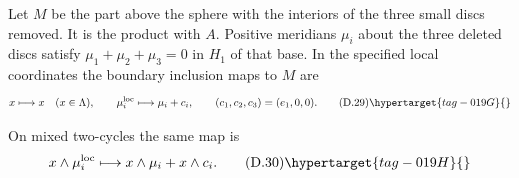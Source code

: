 Let $M$ be the part above the sphere with the
interiors of the three small discs removed. It is the
product with $A$. Positive meridians $\mu_i$ about the
three deleted discs satisfy
$\mu_1+\mu_2+\mu_3=0$ in $H_1$ of that base. In the
specified local coordinates the boundary inclusion maps
to $M$ are
\[
 x\longmapsto x\quad(x\in\Lambda),\qquad
 \mu_i^{\rm loc}\longmapsto\mu_i+c_i,
 \qquad(c_1,c_2,c_3)=(e_1,0,0).
\tag{D.29}\hypertarget{tag-019G}{}\label{cdp:eq:D.29}
\]


On mixed
two-cycles the same map is
\[
 x\wedge\mu_i^{\rm loc}
       \longmapsto x\wedge\mu_i+x\wedge c_i.
\tag{D.30}\hypertarget{tag-019H}{}\label{cdp:eq:D.30}
\]
